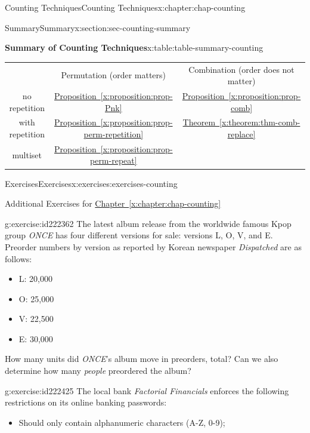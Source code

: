 \documentclass[oneside,10pt,]{book}
\newcommand{\xreffont}{\relax}
\numberwithin{equation}{section}
\newcommand{\hrulemedium}{\noalign{\hrule height 0.07em}}
\begin{document}
\begin{chapterptx}{Counting Techniques}{}{Counting Techniques}{}{}{x:chapter:chap-counting}
\begin{sectionptx}{Summary}{}{Summary}{}{}{x:section:sec-counting-summary}
\begin{tableptx}{\textbf{Summary of Counting Techniques}}{x:table:table-summary-counting}{}
{\begin{tabular}{ccc}
&Permutation (order matters)&Combination (order does not matter)\tabularnewline\hrulemedium
no repetition&\hyperref[x:proposition:prop-Pnk]{Proposition~{\xreffont\ref{x:proposition:prop-Pnk}}}&\hyperref[x:proposition:prop-comb]{Proposition~{\xreffont\ref{x:proposition:prop-comb}}}\tabularnewline[0pt]
with repetition&\hyperref[x:proposition:prop-perm-repetition]{Proposition~{\xreffont\ref{x:proposition:prop-perm-repetition}}}&\hyperref[x:theorem:thm-comb-replace]{Theorem~{\xreffont\ref{x:theorem:thm-comb-replace}}}\tabularnewline[0pt]
multiset&\hyperref[x:proposition:prop-perm-repeat]{Proposition~{\xreffont\ref{x:proposition:prop-perm-repeat}}}&\textendash{} \textendash{} \textendash{} \textendash{} \textendash{}
\end{tabular}
}%
\end{tableptx}%
\end{sectionptx}
%
%
\typeout{************************************************}
\typeout{************************************************}
%
\begin{exercises-section}{Exercises}{}{Exercises}{}{}{x:exercises:exercises-counting}
\begin{introduction}{}%
Additional Exercises for \hyperref[x:chapter:chap-counting]{Chapter~{\xreffont\ref{x:chapter:chap-counting}}}%
\end{introduction}%
\begin{divisionexercise}{1}{}{}{g:exercise:id222362}%
The latest album release from the worldwide famous Kpop group \emph{ONCE} has four different versions for sale: versions L, O, V, and E. Preorder numbers by version as reported by Korean newspaper \emph{Dispatched} are as follows:%
\begin{itemize}[label=\textbullet]
\item{}L: 20,000%
\item{}O: 25,000%
\item{}V: 22,500%
\item{}E: 30,000%
\end{itemize}
How many units did \emph{ONCE}'s album move in preorders, total? Can we also determine how many \emph{people} preordered the album?%
\end{divisionexercise}%
\begin{divisionexercise}{2}{}{}{g:exercise:id222425}%
The local bank \emph{Factorial Financials} enforces the following restrictions on its online banking passwords:%
\begin{itemize}[label=\textbullet]
\item{}Should only contain alphanumeric characters (A-Z, 0-9);%

\end{itemize}
\end{divisionexercise}
\end{exercises-section}
\end{chapterptx}
\end{document}
